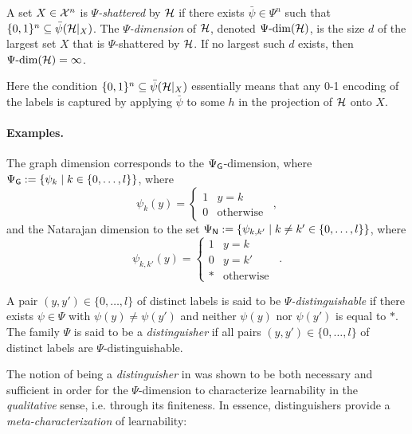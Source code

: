 \documentclass[11pt]{article}
\begin{document}
\begin{definition}
    A set $X\in\mathcal{X}^n$ is \emph{$\Psi$-shattered} by $\mathcal{H}$ if there exists $\bar{\psi}\in\Psi^n$ such that $\{0,1\}^n\subseteq\bar{\psi}(\mathcal{H}|_X)$.
    The \emph{$\Psi$-dimension} of $\mathcal{H}$, denoted $\Psi\text{-}\mathrm{dim}(\mathcal{H})$, is the size $d$ of the largest set $X$ that is $\Psi$-shattered by $\mathcal{H}$. 
    If no largest such $d$ exists, then $\Psi\text{-}\mathrm{dim}(\mathcal{H})=\infty$.
\end{definition}

Here the condition  $\{0,1\}^n\subseteq\bar{\psi}(\mathcal{H}|_X)$ essentially means that any 0-1 encoding of the labels is captured by applying $\bar{\psi}$  to some $h$ in the projection of $\mathcal{H}$ onto $X$.

\paragraph{Examples.}
The graph dimension corresponds to the $\Psi_{\mathsf{G}}$-dimension, where $\Psi_{\mathsf{G}}:=\{\psi_{k}\;|\; k\in\{0,\dots,l\}\}$, where 
$$\psi_{k}(y)
=\begin{cases}
    1 & y=k\\
    0 & \text{otherwise}
\end{cases}\enspace,$$
and the Natarajan dimension to the set $\Psi_{\mathsf{N}}:=\{\psi_{k,k'}\;|\; k\neq k'\in\{0,\dots,l\}\}$, where 
$$\psi_{k,k'}(y)
=\begin{cases}
    1 & y=k\\
    0 & y=k'\\
    * & \text{otherwise}
\end{cases}\enspace.$$

\begin{definition}
    A pair $(y,y')\in\{0,\dots,l\}$ of distinct labels is said to be \emph{$\Psi$-distinguishable} if there exists $\psi\in\Psi$ with $\psi(y)\neq\psi(y')$ and neither $\psi(y)$ nor $\psi(y')$ is equal to $*$.
    The family $\Psi$ is said to be a \emph{distinguisher} if all pairs $(y,y')\in\{0,\dots,l\}$  of distinct labels are $\Psi$-distinguishable.
\end{definition}

The notion of being a \emph{distinguisher} in \cite{ben1992characterizations} was shown to be both necessary and sufficient in order for the $\Psi$-dimension to characterize learnability in the \emph{qualitative} sense, i.e. through its finiteness.
In essence, distinguishers provide a \emph{meta-characterization} of learnability:
\end{document}
